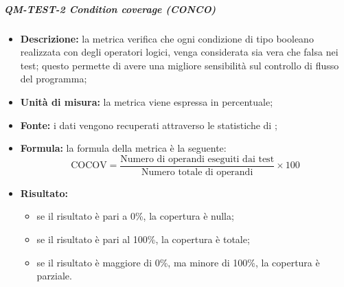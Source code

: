             \subparagraph{QM-TEST-2 Condition coverage (CONCO)}
            \begin{itemize}
                \item \textbf{Descrizione: }
                    la metrica verifica che ogni condizione di tipo booleano realizzata con degli operatori logici, venga considerata sia vera che falsa nei test; questo permette di avere una migliore sensibilità sul controllo di flusso del programma;

                \item \textbf{Unità di misura: }
                	la metrica viene espressa in percentuale;

                \item \textbf{Fonte: }
                    i dati vengono recuperati attraverso le statistiche di ;

                \item \textbf{Formula: }
                	la formula della metrica è la seguente:
                \[
                    \text{COCOV} = \frac{\text{Numero di operandi eseguiti dai test}}{\text{Numero totale di operandi}} \times 100
                \]

                \item \textbf{Risultato: }
                \begin{itemize}
                    \item se il risultato è pari a 0\%, la copertura è nulla;
                    \item se il risultato è pari al 100\%, la copertura è totale;
                    \item se il risultato è maggiore di 0\%, ma minore di 100\%, la copertura è parziale.
                \end{itemize}
            \end{itemize}


